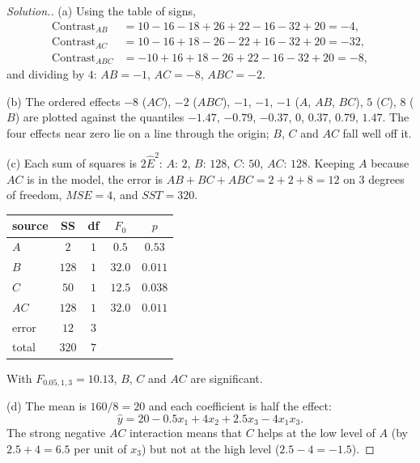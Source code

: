 \documentclass[11pt,a4paper]{article}
\numberwithin{equation}{section}
\theoremstyle{definition}
\newenvironment{solution}
  {\renewcommand{\qedsymbol}{}\begin{proof}[\textit{Solution}.]}
  {\end{proof}}
\begin{document}
\begin{solution}
(a) Using the table of signs,
\begin{align*}
\text{Contrast}_{AB} &= 10 - 16 - 18 + 26 + 22 - 16 - 32 + 20 = -4 , \\
\text{Contrast}_{AC} &= 10 - 16 + 18 - 26 - 22 + 16 - 32 + 20 = -32 , \\
\text{Contrast}_{ABC} &= -10 + 16 + 18 - 26 + 22 - 16 - 32 + 20 = -8 ,
\end{align*}
and dividing by $4$: $AB = -1$, $AC = -8$, $ABC = -2$.

(b) The ordered effects $-8$ ($AC$), $-2$ ($ABC$), $-1$, $-1$, $-1$ ($A$, $AB$, $BC$), $5$ ($C$), $8$ ($B$) are plotted against the quantiles $-1.47$, $-0.79$, $-0.37$, $0$, $0.37$,
$0.79$, $1.47$. The four effects near zero lie on a line through the origin; $B$, $C$ and $AC$ fall well off it.

(c) Each sum of squares is $2\hat E^2$: $A$: $2$, $B$: $128$, $C$: $50$, $AC$: $128$. Keeping $A$ because $AC$ is in the model, the error is $AB + BC + ABC = 2 + 2 + 8 = 12$ on $3$
degrees of freedom, $MSE = 4$, and $SST = 320$.
\begin{center}
\begin{tabular}{l|c|c|c|c}
source & SS & df & $F_0$ & $p$ \\
\hline
$A$ & $2$ & $1$ & $0.5$ & $0.53$ \\
$B$ & $128$ & $1$ & $32.0$ & $0.011$ \\
$C$ & $50$ & $1$ & $12.5$ & $0.038$ \\
$AC$ & $128$ & $1$ & $32.0$ & $0.011$ \\
error & $12$ & $3$ & & \\
\hline
total & $320$ & $7$ & &
\end{tabular}
\end{center}
With $F_{0.05,1,3} = 10.13$, $B$, $C$ and $AC$ are significant.

(d) The mean is $160/8 = 20$ and each coefficient is half the effect:
\[
\hat y = 20 - 0.5x_1 + 4x_2 + 2.5x_3 - 4x_1x_3 .
\]
The strong negative $AC$ interaction means that $C$ helps at the low level of $A$ (by $2.5 + 4 = 6.5$ per unit of $x_3$) but not at the high level ($2.5 - 4 = -1.5$).
\end{solution}
\end{document}
